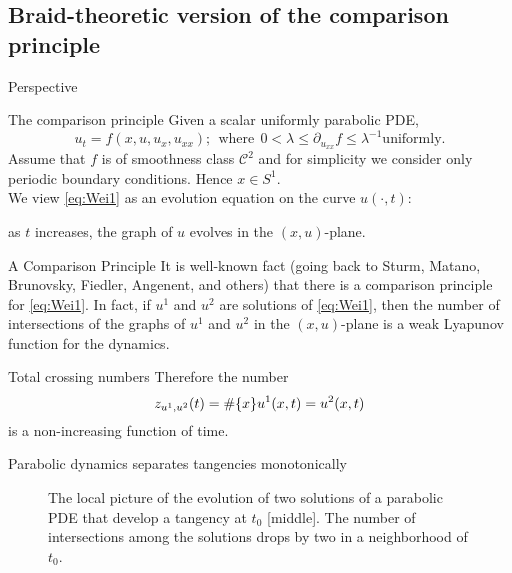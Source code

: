 \documentclass[9pt, english]{beamer}
\theoremstyle{definition}
\begin{document}
\subsection{Braid-theoretic version of the comparison principle}
\begin{frame}{Perspective}
    \begin{block}{The comparison principle}
        Given a scalar uniformly parabolic PDE,
        \begin{equation}\label{eq:Wei1}
        u_t=f(x, u, u_x, u_{xx}); \ \ \textrm{where}\ \ 0<\lambda \leq
        \partial_{u_{xx}}f \leq \lambda^{-1} \textrm{uniformly}.
        \end{equation}\pause
        Assume that $f$ is of smoothness class $\mathscr C^2$ and
        for simplicity we consider only periodic boundary
        conditions. Hence $x \in S^1$.\pause \\
        We view \eqref{eq:Wei1} as an evolution equation on the
        curve $u(\cdot, t):$\pause

        \alert{as $t$ increases, the graph of $u$ evolves in the
        $(x,u)$-plane.}
    \end{block}
\end{frame}
\begin{frame}
    \begin{block}{A Comparison Principle}
        It is well-known fact (going back to Sturm, Matano, Brunovsky,
        Fiedler, Angenent, and others) that there is a \alert{comparison
        principle} for \eqref{eq:Wei1}. \pause
        In fact, if $u^1$ and $u^2$ are  solutions of \eqref{eq:Wei1},
        then the number of intersections of the graphs of $u^1$ and
        $u^2$ in the $(x,u)$-plane is a \alert{weak Lyapunov function
        for the dynamics}.
    \end{block}\pause
    \begin{block}{Total crossing numbers}
        Therefore the number
        {\color{green}
        \[
        z_{u^1, u^2}(t)=\#{\{{x}\}}{u^1(x,t)=u^2(x,t)}
        \]\/}\pause
        is a non-increasing function of time.
    \end{block}

\end{frame}
\begin{frame}{Parabolic dynamics separates tangencies monotonically}
        \begin{figure}\label{fig:tangencies_separation}
        \caption{The local picture of the evolution of two solutions of
        a parabolic PDE that develop a tangency at $t_0$ [middle]. The number of intersections among the solutions
        drops by two in a neighborhood of $t_0$.}
        \end{figure}
\end{frame}
\end{document}
